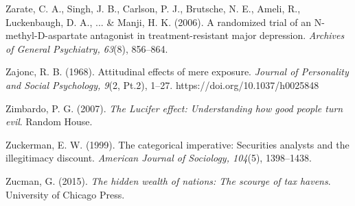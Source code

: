 \begin{thebibliography}{}
    Zarate, C. A., Singh, J. B., Carlson, P. J., Brutsche, N. E., Ameli, R., Luckenbaugh, D. A., ... \& Manji, H. K. (2006). A randomized trial of an N-methyl-D-aspartate antagonist in treatment-resistant major depression. \textit{Archives of General Psychiatry, 63}(8), 856–864.

    Zajonc, R. B. (1968). Attitudinal effects of mere exposure. \textit{Journal of Personality and Social Psychology, 9}(2, Pt.2), 1--27. https://doi.org/10.1037/h0025848

    Zimbardo, P. G. (2007). \textit{The Lucifer effect: Understanding how good people turn evil}. Random House.

    Zuckerman, E. W. (1999). The categorical imperative: Securities analysts and the illegitimacy discount. \textit{American Journal of Sociology, 104}(5), 1398–1438.

    Zucman, G. (2015). \textit{The hidden wealth of nations: The scourge of tax havens}. University of Chicago Press.


    
    

    
    
    
    
    
    
    
    
    
    
    
    
    
    
    
    
    
    
     
    
    
     


\end{thebibliography}